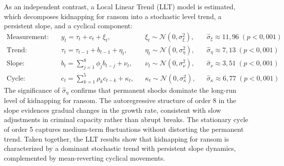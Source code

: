 \documentclass[ecta,nameyear,draft]{econsocart}
\theoremstyle{plain}
\theoremstyle{definition}
\newcommand{\1}{\mathbf{1}}
\begin{document}
As an independent contrast, a Local Linear Trend (LLT) model is estimated, which decomposes kidnapping for ransom into a stochastic level trend, a persistent slope, and a cyclical component:
\begin{equation}
\begin{aligned}
\text{Measurement:} \quad & y_t = \tau_t + c_t + \xi_t,
&& \xi_t \sim \mathcal{N}(0,\sigma_\xi^2),
&& \hat{\sigma}_\xi \approx 11{,}96\;(p<0{,}001) \\[6pt]
\text{Trend:} \quad & \tau_t = \tau_{t-1} + b_{t-1} + \eta_t,
&& \eta_t \sim \mathcal{N}(0,\sigma_\eta^2),
&& \hat{\sigma}_\eta \approx 7{,}13\;(p<0{,}001) \\[6pt]
\text{Slope:} \quad & b_t = \textstyle\sum_{j=1}^{8}\phi_j b_{t-j} + \nu_t,
&& \nu_t \sim \mathcal{N}(0,\sigma_\nu^2),
&& \hat{\sigma}_\nu \approx 3{,}51\;(p<0{,}001) \\[6pt]
\text{Cycle:} \quad & c_t = \textstyle\sum_{k=1}^{5}\rho_k c_{t-k} + \kappa_t,
&& \kappa_t \sim \mathcal{N}(0,\sigma_\kappa^2),
&& \hat{\sigma}_\kappa \approx 6{,}77\;(p<0{,}001)
\end{aligned}
\label{eq:llt}
\end{equation}
The significance of $\hat{\sigma}_\eta$ confirms that permanent shocks dominate the long-run level of kidnapping for ransom. The autoregressive structure of order 8 in the slope evidences gradual changes in the growth rate, consistent with slow adjustments in criminal capacity rather than abrupt breaks. The stationary cycle of order 5 captures medium-term fluctuations without distorting the permanent trend. Taken together, the LLT results show that kidnapping for ransom is characterized by a dominant stochastic trend with persistent slope dynamics, complemented by mean-reverting cyclical movements.
\end{document}
